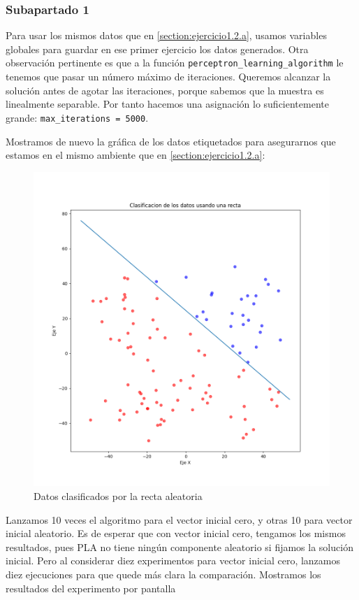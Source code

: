 \documentclass[11pt]{article}
\begin{document}
\subsubsection{Subapartado 1}

Para usar los mismos datos que en \ref{section:ejercicio1.2.a}, usamos variables globales para guardar en ese primer ejercicio los datos generados. Otra observación pertinente es que a la función \lstinline{perceptron_learning_algorithm} le tenemos que pasar un número máximo de iteraciones. Queremos alcanzar la solución antes de agotar las iteraciones, porque sabemos que la muestra es linealmente separable. Por tanto hacemos una asignación lo suficientemente grande: \lstinline{max_iterations = 5000}.

Mostramos de nuevo la gráfica de los datos etiquetados para asegurarnos que estamos en el mismo ambiente que en \ref{section:ejercicio1.2.a}:

\begin{figure}[H]
    \centering
    \includegraphics[scale=0.3]{puntos_clasificados_recta02}
    \caption{Datos clasificados por la recta aleatoria}
\end{figure}

Lanzamos 10 veces el algoritmo para el vector inicial cero, y otras 10 para vector inicial aleatorio. Es de esperar que con vector inicial cero, tengamos los mismos resultados, pues PLA no tiene ningún componente aleatorio si fijamos la solución inicial. Pero al considerar diez experimentos para vector inicial cero, lanzamos diez ejecuciones para que quede más clara la comparación. Mostramos los resultados del experimento por pantalla
\end{document}
